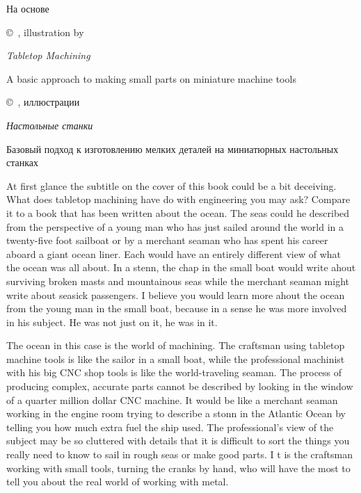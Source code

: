 \label{stanki}
\secdown

На основе 

\copyright\ , illustration by 

\emph{Tabletop Machining}

A basic approach to making small parts on miniature machine tools

\bigskip

\copyright\ , иллюстрации  

\emph{Настольные станки}

Базовый подход к изготовлению мелких деталей на миниатюрных настольных станках

\clearpage
{}


At first glance the subtitle on the cover of this book
could be a bit deceiving. What does tabletop
machining have do with engineering you may ask?
Compare it to a book that has been written about
the ocean. The seas could he described from the
perspective of a young man who has just sailed
around the world in a twenty-five foot sailboat or
by a merchant seaman who has spent his career
aboard a giant ocean liner. Each would have an
entirely different view of what the ocean was all
about. In a stenn, the chap in the small boat would
write ahout surviving broken masts and
mountainous seas while the merchant seaman might
write about seasick passengers. I believe you would
learn more ahout the ocean from the young man in
the small boat, because in a sense he was more
involved in his subject. He was not just on it, he
was in it.


The ocean in this case is the world of machining.
The craftsman using tabletop machine tools is like
the sailor in a small boat, while the professional
machinist with his big CNC shop tools is like the
world-traveling seaman. The process of producing
complex, accurate parts cannot be described by
looking in the window of a quarter million dollar
CNC machine. It would be like a merchant seaman
working in the engine room trying to describe a
stonn in the Atlantic Ocean by telling you how much
extra fuel the ship used. The professional's view of
the subject may be so cluttered with details that it is
difficult to sort the things you really need to know
to sail in rough seas or make good parts. I t is the
craftsman working with small tools, turning the
cranks by hand, who will have the most to tell you
about the real world of working with metal.

